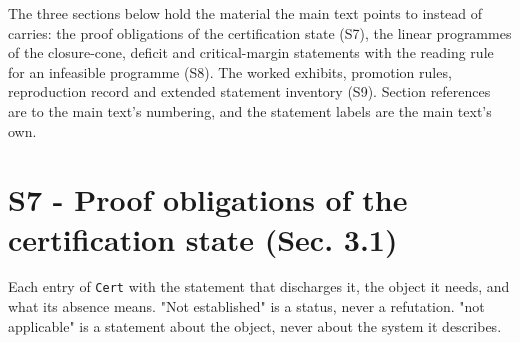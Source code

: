 \documentclass[11pt]{article}
\begin{document}
The three sections below hold the material the main text points to instead of carries: the proof obligations of the certification state (S7), the linear programmes of the closure-cone, deficit and critical-margin statements with the reading rule for an infeasible programme (S8). The worked exhibits, promotion rules, reproduction record and extended statement inventory (S9). Section references are to the main text's numbering, and the statement labels are the main text's own.

\section*{S7 - Proof obligations of the certification state (Sec. 3.1)}\label{s7---proof-obligations-of-the-certification-state-sec-31}

Each entry of \texttt{Cert} with the statement that discharges it, the object it needs, and what its absence means. "Not established" is a status, never a refutation. "not applicable" is a statement about the object, never about the system it describes.
\end{document}
